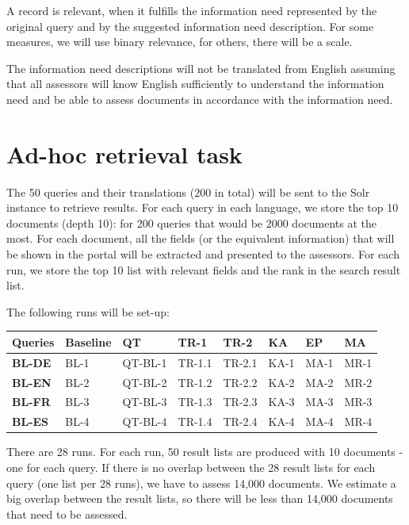 \documentclass[a4paper,11pt]{article}
\begin{document}
A record is relevant, when it fulfills the information need represented by the original
query and by the suggested information need description. For some measures, we will use binary relevance, for others, there will be a scale.

The information need descriptions will not be translated from English assuming that all assessors will know English sufficiently to understand the information need and be able to assess documents in accordance with the information need.


\section{Ad-hoc retrieval task}

The 50 queries and their translations (200 in total) will be sent to the Solr instance to retrieve results. 
For each query in each language, we store the top 10 documents (depth 10): for 200 queries that would be 2000 documents at the most. For each document, all the fields (or the equivalent information) that will be shown in the portal will be extracted and presented to the assessors.
For each run, we store the top 10 list with relevant fields and the rank in the search result list.

The following runs will be set-up:
\newline

\begin{tabular}{|l|l|l|l|l|l|l|l|}

\hline
\textbf{Queries} & \textbf{Baseline} & \textbf{QT} & \textbf{TR-1} & \textbf{TR-2} & \textbf{KA} & \textbf{EP} & \textbf{MA} \\ \hline
\textbf{BL-DE} & BL-1 & QT-BL-1 & TR-1.1 & TR-2.1 & KA-1 & MA-1 & MR-1 \\ \hline
\textbf{BL-EN} & BL-2 & QT-BL-2 & TR-1.2 & TR-2.2 & KA-2 & MA-2 & MR-2 \\ \hline
\textbf{BL-FR} & BL-3 & QT-BL-3 & TR-1.3 & TR-2.3 & KA-3 & MA-3 & MR-3 \\ \hline
\textbf{BL-ES} & BL-4 & QT-BL-4 & TR-1.4 & TR-2.4 & KA-4 & MA-4 & MR-4 \\ \hline

\end{tabular}
\newline

There are 28 runs. For each run, 50 result lists are produced with 10 documents - one for each query. If there is no overlap between the 28 result lists for each query (one list per 28 runs), we have to assess 14,000 documents. We estimate a big overlap between the result lists, so there will be less than 14,000 documents that need to be assessed.
\end{document}
